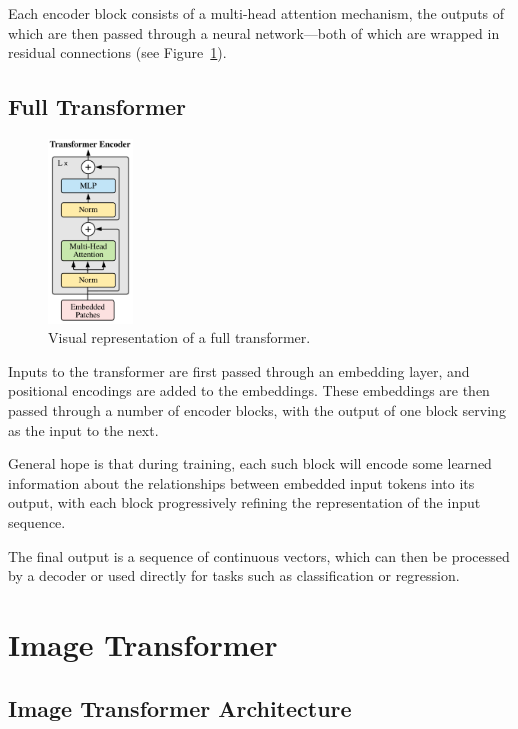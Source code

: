 \documentclass{pracalicmgr}
\begin{document}
Each encoder block consists of a multi-head attention mechanism, the outputs of which are then passed through a neural network—both of which are wrapped in residual connections (see Figure~\ref{fig:transformerEncoder}).

\subsection{Full Transformer} 

\begin{figure}[h]
    \centering
    \includegraphics[width=0.2\textwidth]{src/transformerEncoder.pdf}
    \caption{Visual representation of a full transformer. \cite{Vaswani2017Attention}}
    \label{fig:transformerEncoder}
\end{figure}

Inputs to the transformer are first passed through an embedding layer, and positional encodings are added to the embeddings. These embeddings are then passed through a number of encoder blocks, with the output of one block serving as the input to the next.

General hope is that during training, each such block will encode some learned information about the relationships between embedded input tokens into its output, with each block progressively refining the representation of the input sequence.

The final output is a sequence of continuous vectors, which can then be processed by a decoder or used directly for tasks such as classification or regression.

\section{Image Transformer}

\subsection{Image Transformer Architecture}
\end{document}

